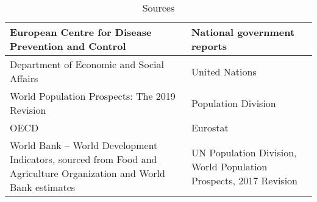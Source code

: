 \documentclass[10pt]{article}
\begin{document}
\begin{table}[htbp]
    \centering
    \begin{tabular}{|p{6cm}|p{6cm}|}
        \hline
        European Centre for Disease Prevention and Control &  National government reports \\
        \hline 
        Department of Economic and Social Affairs & United Nations \\
        \hline
        World Population Prospects: The 2019 Revision & Population Division \\
        \hline 
        OECD & Eurostat \\
        \hline
        World Bank – World Development Indicators, sourced from Food and Agriculture Organization and World Bank estimates &  UN Population Division, World Population Prospects, 2017 Revision\\
        \hline
    \end{tabular}
	\caption{Sources}
	\label{tab:data_sources}
\end{table}
\end{document}
